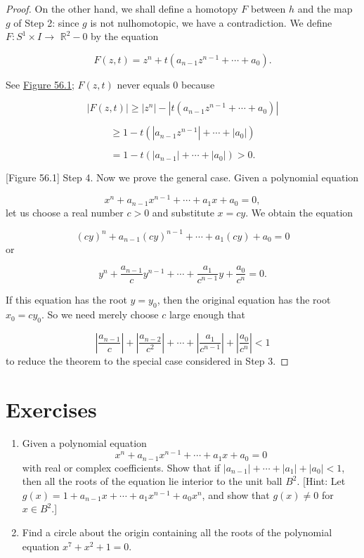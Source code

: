 \begin{proof}
On the other hand, we shall define a homotopy \(F\) between \(h\) and the map \(g\) of Step 2: since \(g\) is not nulhomotopic, we have a contradiction. We define \(F : S^{1} \times I \rightarrow\) \(\mathbb{R}^{2} - 0\) by the equation

\[
F( {z,t}) = z^{n} + t( {a_{n - 1}z^{n - 1} + \cdots + a_{0}}).
\]

See \hyperref[fig:56.1]{Figure 56.1}; \(F( {z,t})\) never equals 0 because

\[
| {F( {z,t}) }| \geq | z^{n}| - | {t( {a_{n - 1}z^{n - 1} + \cdots + a_{0}}) }|
\]

\[
\geq 1 - t( {| {a_{n - 1}z^{n - 1}}| + \cdots + | a_{0}| })
\]

\[
= 1 - t( {| a_{n - 1}| + \cdots + | a_{0}| }) > 0\text{.}
\]

[Figure 56.1]
Step 4. Now we prove the general case. Given a polynomial equation

\[
x^{n} + a_{n - 1}x^{n - 1} + \cdots + a_{1}x + a_{0} = 0,
\]
let us choose a real number \(c > 0\) and substitute \(x = {cy}\). We obtain the equation

\[
{( cy) }^{n} + a_{n - 1}{( cy) }^{n - 1} + \cdots + a_{1}( {cy}) + a_{0} = 0
\]
or

\[
y^{n} + \frac{a_{n - 1}}{c}y^{n - 1} + \cdots + \frac{a_{1}}{c^{n - 1}}y + \frac{a_{0}}{c^{n}} = 0.
\]

If this equation has the root \(y = y_{0}\), then the original equation has the root \(x_{0} = cy_{0}\). So we need merely choose \(c\) large enough that

\[
| \frac{a_{n - 1}}{c}| + | \frac{a_{n - 2}}{c^{2}}| + \cdots + | \frac{a_{1}}{c^{n - 1}}| + | \frac{a_{0}}{c^{n}}| < 1
\]
to reduce the theorem to the special case considered in Step 3.
\end{proof}
\section*{Exercises}
\begin{enumerate}[itemsep=0.4em, parsep=0pt, topsep=0pt, partopsep=0pt, leftmargin=*, label=\arabic*., ref=\arabic*]
\item Given a polynomial equation \[ x^{n} + a_{n - 1}x^{n - 1} + \cdots + a_{1}x + a_{0} = 0 \] with real or complex coefficients. Show that if \(| a_{n - 1}| + \cdots + | a_{1}| + | a_{0}| < 1\), then all the roots of the equation lie interior to the unit ball \(B^{2}\). [Hint: Let \(g(x) = 1 + a_{n - 1}x + \cdots + a_{1}x^{n - 1} + a_{0}x^{n}\), and show that \(g(x) \neq 0\) for \(x \in {B}^{2}\).]
\item Find a circle about the origin containing all the roots of the polynomial equation \(x^{7} + x^{2} + 1 = 0.\)
\end{enumerate}

